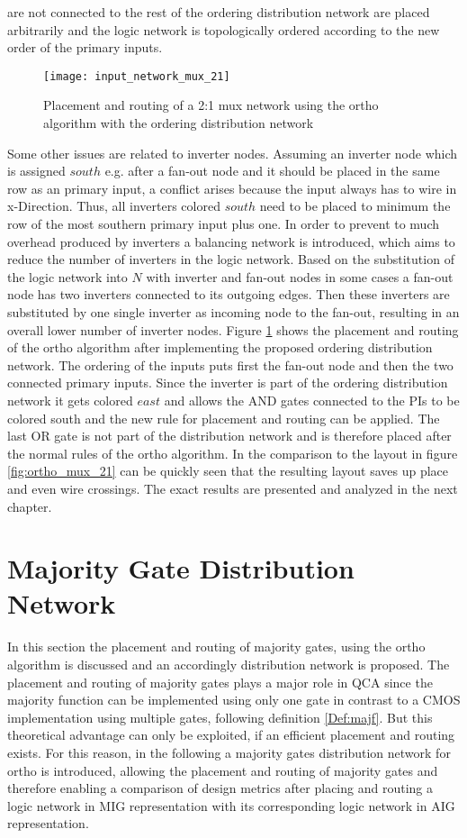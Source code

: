 are not connected to the rest of the ordering distribution network are placed arbitrarily and the logic network is topologically ordered according to the new order of the primary inputs.


\begin{figure}
	\centering
	\texttt{[image: input\_network\_mux\_21]}
	\caption{Placement and routing of a 2:1 mux network using the ortho algorithm with the ordering distribution network}\label{fig:input_network_mux_21}
\end{figure}

Some other issues are related to inverter nodes. Assuming an inverter node which is assigned $south$ e.g. after a fan-out node and it should be placed in the same row as an primary input, a conflict arises because the input always has to wire in x-Direction. Thus, all inverters colored $south$ need to be placed to minimum the row of the most southern primary input plus one. In order to prevent to much overhead produced by inverters a balancing network is introduced, which aims to reduce the number of inverters in the logic network. Based on the substitution of the logic network into $N$ with inverter and fan-out nodes in some cases a fan-out node has two inverters connected to its outgoing edges. Then these inverters are substituted by one single inverter as incoming node to the fan-out, resulting in an overall lower number of inverter nodes.
Figure \ref{fig:input_network_mux_21} shows the placement and routing of the ortho algorithm after implementing the proposed ordering distribution network. The ordering of the inputs puts first the fan-out node and then the two connected primary inputs. Since the inverter is part of the ordering distribution network it gets colored $east$ and allows the AND gates connected to the PIs to be colored south and the new rule for placement and routing can be applied. The last OR gate is not part of the distribution network and is therefore placed after the normal rules of the ortho algorithm. In the comparison to the layout in figure \ref{fig:ortho_mux_21} can be quickly seen that the resulting layout saves up place and even wire crossings. The exact results are presented and analyzed in the next chapter.

\section{Majority Gate Distribution Network}\label{sec:majgatedisnet}
In this section the placement and routing of majority gates, using the ortho algorithm is discussed and an accordingly distribution network is proposed. The placement and routing of majority gates plays a major role in QCA since the majority function can be implemented using only one gate in contrast to a CMOS implementation using multiple gates, following definition \ref{Def:majf}. But this theoretical advantage can only be exploited, if an efficient placement and routing exists. For this reason, in the following a majority gates distribution network for ortho is introduced, allowing the placement and routing of majority gates and therefore enabling a comparison of design metrics after placing and routing a logic network in MIG representation with its corresponding logic network in AIG representation.


